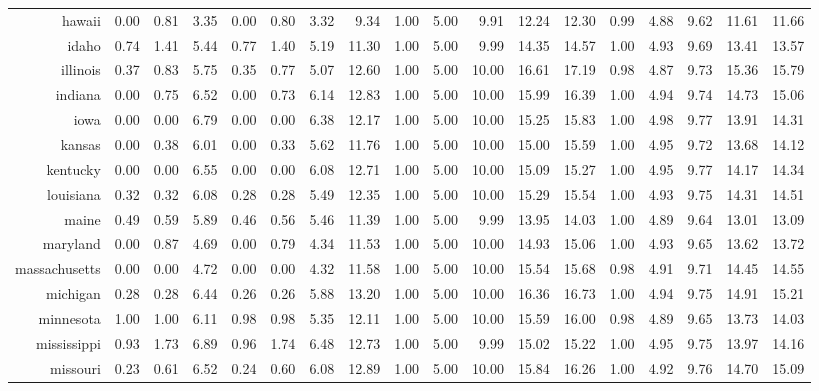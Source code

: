 \documentclass{article} %
\begin{document}
\begin{table}[ht]
\begin{tabular}{rrrrrrrrrrrrrrrrrr}
  hawaii & 0.00 & 0.81 & 3.35 & 0.00 & 0.80 & 3.32 & 9.34 & 1.00 & 5.00 & 9.91 & 12.24 & 12.30 & 0.99 & 4.88 & 9.62 & 11.61 & 11.66 \\
  idaho & 0.74 & 1.41 & 5.44 & 0.77 & 1.40 & 5.19 & 11.30 & 1.00 & 5.00 & 9.99 & 14.35 & 14.57 & 1.00 & 4.93 & 9.69 & 13.41 & 13.57 \\
  illinois & 0.37 & 0.83 & 5.75 & 0.35 & 0.77 & 5.07 & 12.60 & 1.00 & 5.00 & 10.00 & 16.61 & 17.19 & 0.98 & 4.87 & 9.73 & 15.36 & 15.79 \\
  indiana & 0.00 & 0.75 & 6.52 & 0.00 & 0.73 & 6.14 & 12.83 & 1.00 & 5.00 & 10.00 & 15.99 & 16.39 & 1.00 & 4.94 & 9.74 & 14.73 & 15.06 \\
  iowa & 0.00 & 0.00 & 6.79 & 0.00 & 0.00 & 6.38 & 12.17 & 1.00 & 5.00 & 10.00 & 15.25 & 15.83 & 1.00 & 4.98 & 9.77 & 13.91 & 14.31 \\
  kansas & 0.00 & 0.38 & 6.01 & 0.00 & 0.33 & 5.62 & 11.76 & 1.00 & 5.00 & 10.00 & 15.00 & 15.59 & 1.00 & 4.95 & 9.72 & 13.68 & 14.12 \\
  kentucky & 0.00 & 0.00 & 6.55 & 0.00 & 0.00 & 6.08 & 12.71 & 1.00 & 5.00 & 10.00 & 15.09 & 15.27 & 1.00 & 4.95 & 9.77 & 14.17 & 14.34 \\
  louisiana & 0.32 & 0.32 & 6.08 & 0.28 & 0.28 & 5.49 & 12.35 & 1.00 & 5.00 & 10.00 & 15.29 & 15.54 & 1.00 & 4.93 & 9.75 & 14.31 & 14.51 \\
  maine & 0.49 & 0.59 & 5.89 & 0.46 & 0.56 & 5.46 & 11.39 & 1.00 & 5.00 & 9.99 & 13.95 & 14.03 & 1.00 & 4.89 & 9.64 & 13.01 & 13.09 \\
  maryland & 0.00 & 0.87 & 4.69 & 0.00 & 0.79 & 4.34 & 11.53 & 1.00 & 5.00 & 10.00 & 14.93 & 15.06 & 1.00 & 4.93 & 9.65 & 13.62 & 13.72 \\
  massachusetts & 0.00 & 0.00 & 4.72 & 0.00 & 0.00 & 4.32 & 11.58 & 1.00 & 5.00 & 10.00 & 15.54 & 15.68 & 0.98 & 4.91 & 9.71 & 14.45 & 14.55 \\
  michigan & 0.28 & 0.28 & 6.44 & 0.26 & 0.26 & 5.88 & 13.20 & 1.00 & 5.00 & 10.00 & 16.36 & 16.73 & 1.00 & 4.94 & 9.75 & 14.91 & 15.21 \\
  minnesota & 1.00 & 1.00 & 6.11 & 0.98 & 0.98 & 5.35 & 12.11 & 1.00 & 5.00 & 10.00 & 15.59 & 16.00 & 0.98 & 4.89 & 9.65 & 13.73 & 14.03 \\
  mississippi & 0.93 & 1.73 & 6.89 & 0.96 & 1.74 & 6.48 & 12.73 & 1.00 & 5.00 & 9.99 & 15.02 & 15.22 & 1.00 & 4.95 & 9.75 & 13.97 & 14.16 \\
  missouri & 0.23 & 0.61 & 6.52 & 0.24 & 0.60 & 6.08 & 12.89 & 1.00 & 5.00 & 10.00 & 15.84 & 16.26 & 1.00 & 4.92 & 9.76 & 14.70 & 15.09 \\

\end{tabular}
\end{table}
\end{document}

